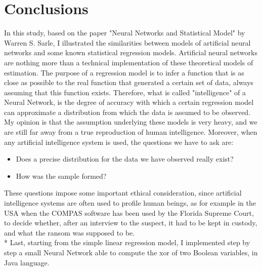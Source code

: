\documentclass[10pt,a4paper]{article}
\begin{document}
\section{Conclusions}
In this study, based on the paper "Neural Networks and Statistical Model" by Warren S. Sarle, I illustrated the similarities between models of artificial neural networks and some known statistical regression models. Artificial neural networks are nothing more than a technical implementation of these theoretical models of estimation. The purpose of a regression model is to infer a function that is as close as possible to the real function that generated a certain set of data, always assuming that this function exists. Therefore, what is called "intelligence" of a Neural Network, is the degree of accuracy with which a certain regression model can approximate a distribution from which the data is assumed to be observed. My opinion is that the assumption underlying these models is very heavy, and we are still far away from a true reproduction of human intelligence. Moreover, when any artificial intelligence system is used, the questions we have to ask are:
\begin{itemize}
	\item Does a precise distribution for the data we have observed really exist?
	\item How was the sample formed?
\end{itemize}
These questions impose some important ethical consideration, since artificial intelligence systems are often used to profile human beings, as for example in the USA when the COMPAS software has been used by the Florida Supreme Court, to decide whether, after an interview to the suspect, it had to be kept in custody, and what the ransom was supposed to be.\\* Last, starting from the simple linear regression model, I implemented step by step a small Neural Network able to compute the xor of two Boolean variables, in Java language.
\end{document}
